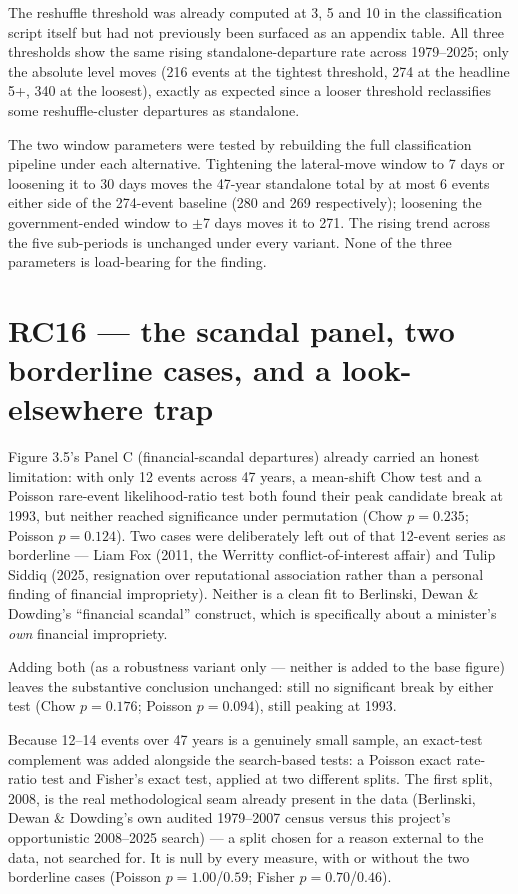 The reshuffle threshold was already computed at 3, 5 and 10 in the classification script itself but
had not previously been surfaced as an appendix table. All three thresholds show the same rising
standalone-departure rate across 1979--2025; only the absolute level moves (216 events at the
tightest threshold, 274 at the headline 5+, 340 at the loosest), exactly as expected since a looser
threshold reclassifies some reshuffle-cluster departures as standalone.

The two window parameters were tested by rebuilding the full classification pipeline under each
alternative. Tightening the lateral-move window to 7 days or loosening it to 30 days moves the
47-year standalone total by at most 6 events either side of the 274-event baseline (280 and 269
respectively); loosening the government-ended window to $\pm$7 days moves it to 271. The rising
trend across the five sub-periods is unchanged under every variant. None of the three parameters is
load-bearing for the finding.

\section{RC16 --- the scandal panel, two borderline cases, and a look-elsewhere trap}

Figure 3.5's Panel C (financial-scandal departures) already carried an honest limitation: with only
12 events across 47 years, a mean-shift Chow test and a Poisson rare-event likelihood-ratio test
both found their peak candidate break at 1993, but neither reached significance under permutation
(Chow $p=0.235$; Poisson $p=0.124$). Two cases were deliberately left out of that 12-event series as
borderline --- Liam Fox (2011, the Werritty conflict-of-interest affair) and Tulip Siddiq (2025,
resignation over reputational association rather than a personal finding of financial impropriety).
Neither is a clean fit to Berlinski, Dewan \& Dowding's ``financial scandal'' construct, which is
specifically about a minister's \emph{own} financial impropriety.

Adding both (as a robustness variant only --- neither is added to the base figure) leaves the
substantive conclusion unchanged: still no significant break by either test (Chow $p=0.176$;
Poisson $p=0.094$), still peaking at 1993.

Because 12--14 events over 47 years is a genuinely small sample, an exact-test complement was added
alongside the search-based tests: a Poisson exact rate-ratio test and Fisher's exact test, applied
at two different splits. The first split, 2008, is the real methodological seam already present in
the data (Berlinski, Dewan \& Dowding's own audited 1979--2007 census versus this project's
opportunistic 2008--2025 search) --- a split chosen for a reason external to the data, not searched
for. It is null by every measure, with or without the two borderline cases (Poisson $p=1.00$/$0.59$;
Fisher $p=0.70$/$0.46$).

